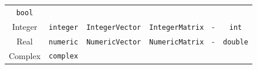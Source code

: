 \documentclass[]{book}
\theoremstyle{definition}
\theoremstyle{definition}
\theoremstyle{remark}
\begin{document}
\begin{longtable}[]{@{}cccccc@{}}
\begin{minipage}[t]{0.07\columnwidth}
\texttt{bool}\strut
\end{minipage}\tabularnewline
\begin{minipage}[t]{0.07\columnwidth}\centering\strut
Integer\strut
\end{minipage} & \begin{minipage}[t]{0.07\columnwidth}\centering\strut
\texttt{integer}\strut
\end{minipage} & \begin{minipage}[t]{0.07\columnwidth}\centering\strut
\texttt{IntegerVector}\strut
\end{minipage} & \begin{minipage}[t]{0.07\columnwidth}\centering\strut
\texttt{IntegerMatrix}\strut
\end{minipage} & \begin{minipage}[t]{0.07\columnwidth}\centering\strut
-\strut
\end{minipage} & \begin{minipage}[t]{0.07\columnwidth}\centering\strut
\texttt{int}\strut
\end{minipage}\tabularnewline
\begin{minipage}[t]{0.07\columnwidth}\centering\strut
Real\strut
\end{minipage} & \begin{minipage}[t]{0.07\columnwidth}\centering\strut
\texttt{numeric}\strut
\end{minipage} & \begin{minipage}[t]{0.07\columnwidth}\centering\strut
\texttt{NumericVector}\strut
\end{minipage} & \begin{minipage}[t]{0.07\columnwidth}\centering\strut
\texttt{NumericMatrix}\strut
\end{minipage} & \begin{minipage}[t]{0.07\columnwidth}\centering\strut
-\strut
\end{minipage} & \begin{minipage}[t]{0.07\columnwidth}\centering\strut
\texttt{double}\strut
\end{minipage}\tabularnewline
\begin{minipage}[t]{0.07\columnwidth}\centering\strut
Complex\strut
\end{minipage} & \begin{minipage}[t]{0.07\columnwidth}\centering\strut
\texttt{complex}\strut
\end{minipage} & \begin{minipage}[t]{0.07\columnwidth}\centering\strut

\end{minipage}
\end{longtable}
\end{document}
